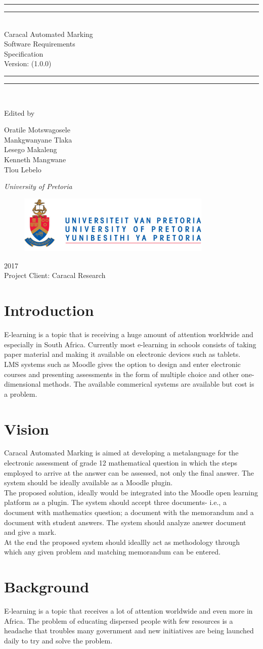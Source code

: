 \documentclass{article}
\newcommand*{\titleGP}{\begingroup %
\centering %
\vspace*{\baselineskip} %

\rule{\textwidth}{1.6pt}\vspace*{-\baselineskip}\vspace*{2pt} %
\rule{\textwidth}{0.4pt}\\[\baselineskip] %

{\LARGE Caracal Automated Marking \\ Software Requirements \\ Specification}\\[0.2\baselineskip]  %

Version: (1.0.0) 


\rule{\textwidth}{0.4pt}\vspace*{-\baselineskip}\vspace{3.2pt} %
\rule{\textwidth}{1.6pt}\\[\baselineskip] %

\scshape %
\vspace*{2\baselineskip} %

Edited by \\[\baselineskip]
{\Large Oratile Motswagosele \\ Mankgwanyane Tlaka \\ Lesego Makaleng \\ Kenneth Mangwane \\ Tlou Lebelo\par} %

{\itshape University of Pretoria\par} %

\begin{figure}[t]
\centering
	\includegraphics[width=350px]{UP_Logo.PNG}
\end{figure}

{\scshape 2017} \\[0.3\baselineskip] %
{ Project Client: Caracal Research}\par %

\endgroup}
\begin{document}
 

\titleGP %
\pagebreak

\clearpage
\tableofcontents
\clearpage

\section{Introduction}

E-learning is a topic that is receiving a huge amount of attention worldwide and especially in South Africa. Currently most e-learning in schools consists of taking paper material and making it available on electronic devices such as tablets. \\ 

LMS systems such as Moodle gives the option to design and enter electronic courses and presenting assessments in the form of multiple choice and other one-dimensional methods. The available commerical systems are available but cost is a problem.

\section{Vision}

Caracal Automated Marking is aimed at  developing a metalanguage for the electronic assessment of grade 12 mathematical question in which the steps employed to arrive at the answer can be assessed, not only the final answer. The system should be ideally available as a Moodle plugin. \\

The proposed solution, ideally would be integrated into the Moodle open learning platform as a plugin. The system should accept three documents- i.e., a document with mathematics question; a document with the memorandum and a document with student answers. The system should analyze answer document and give a mark. \\

At the end the proposed  system should ideallly act as methodology through which any given problem and matching memorandum can be entered. 

\section{Background}

E-learning is a topic that receives a lot of attention worldwide and even more in Africa. The problem of educating dispersed people with few resources is a headache that troubles many government and new initiatives are being launched daily to try and solve the problem. \\
\end{document}
